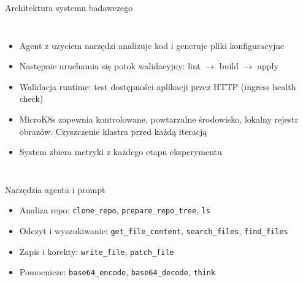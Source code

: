 \documentclass[aspectratio=169]{beamer}
\begin{document}
\begin{frame}{Architektura systemu badawczego}
    \begin{columns}[T]
        \begin{itemize}
            \item Agent z użyciem narzędzi analizuje kod i generuje pliki konfiguracyjne
            \item Następnie uruchamia się potok walidacyjny: lint $\rightarrow$ build $\rightarrow$ apply
            \item Walidacja runtime: test dostępności aplikacji przez HTTP (ingress health check)
            \item MicroK8s zapewnia kontrolowane, powtarzalne środowisko, lokalny rejestr obrazów. Czyszczenie klastra przed każdą iteracją
            \item System zbiera metryki z każdego etapu eksperymentu
        \end{itemize}
        \centering
    \end{columns}
\end{frame}

\begin{frame}{Narzędzia agenta i prompt}
    \begin{itemize}
        \item Analiza repo: \texttt{clone\_repo}, \texttt{prepare\_repo\_tree}, \texttt{ls}
        \item Odczyt i wyszukiwanie: \texttt{get\_file\_content}, \texttt{search\_files}, \texttt{find\_files}
        \item Zapis i korekty: \texttt{write\_file}, \texttt{patch\_file}
        \item Pomocnicze: \texttt{base64\_encode}, \texttt{base64\_decode}, \texttt{think}
    \end{itemize}
\end{frame}
\end{document}
